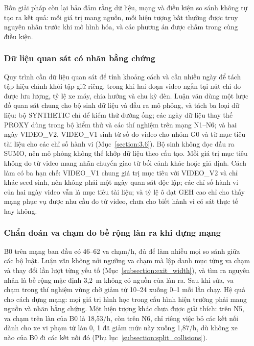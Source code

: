 \documentclass[../main.tex]{subfiles}
\begin{document}
Bốn giải pháp còn lại bảo đảm rằng dữ liệu, mạng và điều kiện so sánh không tự tạo ra kết quả: mỗi giá trị mang nguồn, mỗi hiện tượng bất thường được truy nguyên nhân trước khi mô hình hóa, và các phương án được chấm trong cùng điều kiện.

\subsubsection{Dữ liệu quan sát có nhãn bằng chứng}
\label{section:5.4}

Quy trình cần dữ liệu quan sát để tính khoảng cách và cần nhiều ngày để tách tập hiệu chỉnh khỏi tập giữ riêng, trong khi hai đoạn video ngắn tại nút chỉ đo được lưu lượng, tỷ lệ xe máy, chia hướng và chu kỳ đèn. Luận văn dùng một lược đồ quan sát chung cho bộ sinh dữ liệu và đầu ra mô phỏng, và tách ba loại dữ liệu: bộ SYNTHETIC chỉ để kiểm thử đường ống; các ngày dữ liệu thay thế PROXY dùng trong bộ kiểm thử và các thí nghiệm trên mạng N1--N6; và hai ngày VIDEO\_V2, VIDEO\_V1 sinh từ số đo video cho nhóm G0 và từ mục tiêu tài liệu cho các chỉ số hành vi (Mục~\ref{section:3.6}). Bộ sinh không đọc đầu ra SUMO, nên mô phỏng không thể khớp dữ liệu theo cấu tạo. Mỗi giá trị mục tiêu không đo từ video mang nhãn chuyển giao từ bối cảnh khác hoặc giả định. Cách làm có ba hạn chế: VIDEO\_V1 chung giá trị mục tiêu với VIDEO\_V2 và chỉ khác seed sinh, nên không phải một ngày quan sát độc lập; các chỉ số hành vi của hai ngày video vẫn là mục tiêu tài liệu; và tỷ lệ ô đạt GEH cao chỉ cho thấy mạng phục vụ được nhu cầu đo từ video, chưa cho biết hành vi có sát thực tế hay không.

\subsubsection{Chẩn đoán va chạm do bề rộng làn ra khi dựng mạng}
\label{section:5.5}

B0 trên mạng ban đầu có 46--62 va chạm/h, đủ để làm nhiễu mọi so sánh giữa các bộ luật. Luận văn không nới ngưỡng va chạm mà lập danh mục từng va chạm và thay đổi lần lượt từng yếu tố (Mục~\ref{subsection:exit_width}), và tìm ra nguyên nhân là bề rộng mặc định 3,2~m không có nguồn của làn ra. Sau khi sửa, va chạm trong thí nghiệm vùng chờ giảm từ 10--24 xuống 0--1 mỗi lần chạy. Hệ quả cho cách dựng mạng: mọi giá trị hình học trong cấu hình hiện trường phải mang nguồn và nhãn bằng chứng. Một hiện tượng khác chưa được giải thích: trên N5, va chạm trên làn của B0 là 18,53/h, còn trên N6, chỉ riêng việc bỏ các kết nối dành cho xe vi phạm từ làn 0, 1 đã giảm mức này xuống 1,87/h, dù không xe nào của B0 đi các kết nối đó (Phụ lục~\ref{subsection:split_collisions}).
\end{document}
